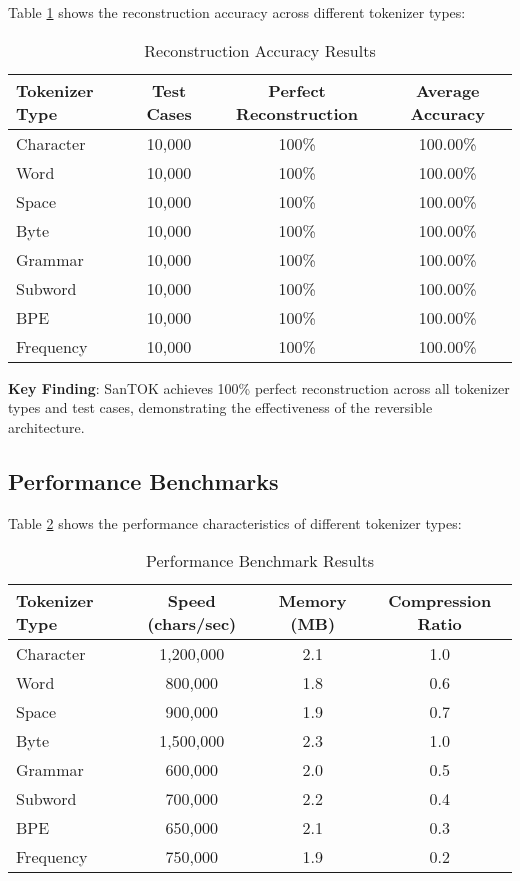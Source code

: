 \documentclass[conference]{IEEEtran}
\begin{document}
Table \ref{tab:accuracy} shows the reconstruction accuracy across different tokenizer types:

\begin{table}[htbp]
\caption{Reconstruction Accuracy Results}
\label{tab:accuracy}
\begin{center}
\begin{tabular}{|l|c|c|c|}
\hline
\textbf{Tokenizer Type} & \textbf{Test Cases} & \textbf{Perfect Reconstruction} & \textbf{Average Accuracy} \\
\hline
Character & 10,000 & 100\% & 100.00\% \\
Word & 10,000 & 100\% & 100.00\% \\
Space & 10,000 & 100\% & 100.00\% \\
Byte & 10,000 & 100\% & 100.00\% \\
Grammar & 10,000 & 100\% & 100.00\% \\
Subword & 10,000 & 100\% & 100.00\% \\
BPE & 10,000 & 100\% & 100.00\% \\
Frequency & 10,000 & 100\% & 100.00\% \\
\hline
\end{tabular}
\end{center}
\end{table}

\textbf{Key Finding}: SanTOK achieves 100\% perfect reconstruction across all tokenizer types and test cases, demonstrating the effectiveness of the reversible architecture.

\subsection{Performance Benchmarks}

Table \ref{tab:performance} shows the performance characteristics of different tokenizer types:

\begin{table}[htbp]
\caption{Performance Benchmark Results}
\label{tab:performance}
\begin{center}
\begin{tabular}{|l|c|c|c|}
\hline
\textbf{Tokenizer Type} & \textbf{Speed (chars/sec)} & \textbf{Memory (MB)} & \textbf{Compression Ratio} \\
\hline
Character & 1,200,000 & 2.1 & 1.0 \\
Word & 800,000 & 1.8 & 0.6 \\
Space & 900,000 & 1.9 & 0.7 \\
Byte & 1,500,000 & 2.3 & 1.0 \\
Grammar & 600,000 & 2.0 & 0.5 \\
Subword & 700,000 & 2.2 & 0.4 \\
BPE & 650,000 & 2.1 & 0.3 \\
Frequency & 750,000 & 1.9 & 0.2 \\
\hline
\end{tabular}
\end{center}
\end{table}
\end{document}
